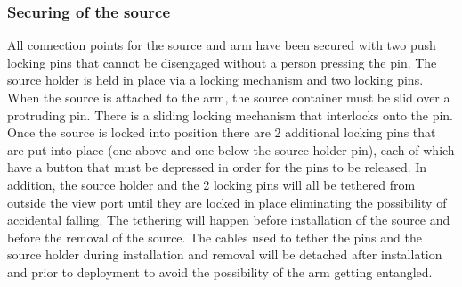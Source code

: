 \subsubsection{Securing of the source}
All connection points for the source and arm have been secured with two push locking pins that cannot be disengaged without a person pressing the pin. 
The source holder is held in place via a locking mechanism and two locking pins. When the source is attached to the arm, the source container must be slid over a protruding pin. There is a sliding locking mechanism that interlocks onto the pin. Once the source is locked into position there are 2 additional locking pins that are put into place (one above and one below the source holder pin), each of which have a button that must be depressed in order for the pins to be released. In addition, the source holder and the 2 locking pins will all be tethered from outside the view port until they are locked in place eliminating the possibility of accidental falling.  The tethering will happen before installation of the source and before the removal of the source. The cables used to tether the pins and the source holder during installation and removal will be detached after installation and prior to deployment to avoid the possibility of the arm getting entangled.  
 

